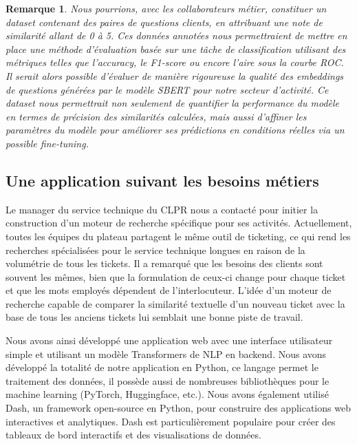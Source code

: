\documentclass[12pt]{article}
\newtheorem{rmq}{Remarque}
\theoremstyle{definition}
\begin{document}
\begin{rmq}
	
	Nous pourrions, avec les collaborateurs métier, constituer un dataset contenant des paires de questions clients, en attribuant une note de similarité allant de 0 à 5. Ces données annotées nous permettraient de mettre en place une méthode d'évaluation basée sur une tâche de classification utilisant des métriques telles que l'accuracy, le F1-score ou encore l'aire sous la courbe ROC. Il serait alors possible d'évaluer de manière rigoureuse la qualité des embeddings de questions générées par le modèle SBERT pour notre secteur d'activité. Ce dataset nous permettrait non seulement de quantifier la performance du modèle en termes de précision des similarités calculées, mais aussi d'affiner les paramètres du modèle pour améliorer ses prédictions en conditions réelles via un possible fine-tuning.
	
	
\end{rmq}

\subsection{Une application suivant les besoins métiers}

Le manager du service technique du CLPR nous a contacté pour initier la construction d'un moteur de recherche spécifique pour ses activités. Actuellement, toutes les équipes du plateau partagent le même outil de ticketing, ce qui rend les recherches spécialisées pour le service technique longues en raison de la volumétrie de tous les tickets. Il a remarqué que les besoins des clients sont souvent les mêmes, bien que la formulation de ceux-ci change pour chaque ticket et que les mots employés dépendent de l'interlocuteur. L'idée d'un moteur de recherche capable de comparer la similarité textuelle d'un nouveau ticket avec la base de tous les anciens tickets lui semblait une bonne piste de travail.

Nous avons ainsi développé une application web avec une interface utilisateur simple et utilisant un modèle Transformers de NLP en backend. Nous avons développé la totalité de notre application en Python, ce langage permet le traitement des données, il possède aussi de nombreuses bibliothèques pour le machine learning (PyTorch, Huggingface, etc.). Nous avons également utilisé Dash, un framework open-source en Python, pour construire des applications web interactives et analytiques. Dash est particulièrement populaire pour créer des tableaux de bord interactifs et des visualisations de données.
 
\end{document}

